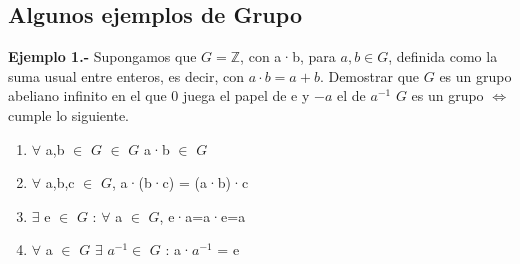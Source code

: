 \documentclass[10pt,a4paper,oneside]{article}
\begin{document}
			\subsection{Algunos ejemplos de Grupo}
				\textbf{Ejemplo 1.-} Supongamos que $G = \mathbb{Z}$, con a·b, para $a,b\in G$, definida como la suma usual entre enteros, es decir, con $a·b=a+b$. Demostrar que $G$ es un grupo abeliano infinito en el que 0 juega el papel de e y $-a$ el de $a^{-1}$
				$G$ es un grupo $\iff$ cumple lo siguiente.
				\begin{enumerate}
					\item $\forall$ a,b $\in$ $G$ $\in$ $G$ a·b $\in$ $G$
					\item $\forall$ a,b,c $\in$ $G$, a·(b·c) = (a·b)·c
					\item $\exists$ e $\in$ $G$ : $\forall$ a $\in$ $G$, e·a=a·e=a
					\item $\forall$ a $\in$ $G$ $\exists$ $a^{-1} \in$ $G$ : a·$a^{-1}$ = e
				\end{enumerate}
\end{document}
